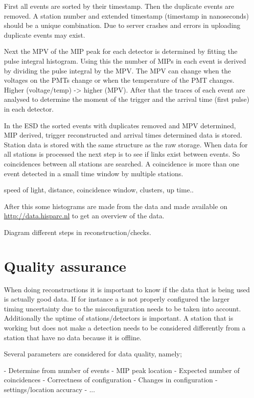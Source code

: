 First all events are sorted by their timestamp. Then the duplicate
events are removed. A station number and extended timestamp (timestamp
in nanoseconds) should be a unique combination. Due to server crashes
and errors in uploading duplicate events may exist.

Next the MPV of the MIP peak for each detector is determined by fitting
the pulse integral histogram. Using this the number of MIPs in each
event is derived by dividing the pulse integral by the MPV. The MPV can
change when the voltages on the PMTs change or when the temperature of
the PMT changes. Higher (voltage/temp) -> higher (MPV). After that the
traces of each event are analysed to determine the moment of the trigger
and the arrival time (first pulse) in each detector.

In the ESD the sorted events with duplicates removed and MPV determined,
MIP derived, trigger reconstructed and arrival times determined data is
stored. Station data is stored with the same structure as the raw
storage. When data for all stations is processed the next step is to see
if links exist between events. So coincidences between all stations are
searched. A coincidence is more than one event detected in a small time
window by multiple stations.

speed of light, distance, coincidence window, clusters, up time..

After this some histograms are made from the data and made available on
\url{http://data.hisparc.nl} to get an overview of the data.

Diagram different steps in reconstruction/checks.


\section{Quality assurance}

When doing reconstructions it is important to know if the data that is
being used is actually good data. If for instance a \gps is not properly
configured the larger timing uncertainty due to the misconfiguration
needs to be taken into account. Additionally the uptime of
stations/detectors is important. A station that is working but does not
make a detection needs to be considered differently from a station that
have no data because it is offline.

Several parameters are considered for data quality, namely;

- Determine from number of events
- MIP peak location
- Expected number of coincidences
- Correctness of configuration
- Changes in configuration
- \gps settings/location accuracy
- ...

